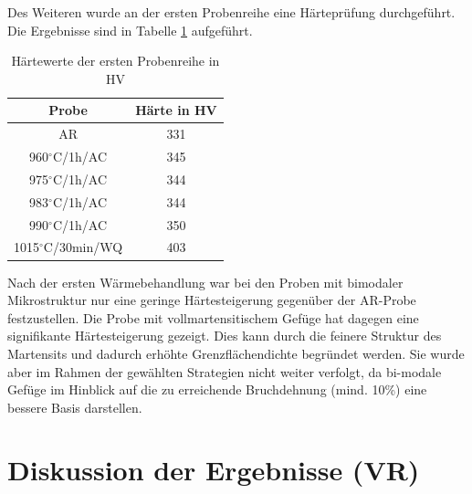 \pagebreak

Des Weiteren wurde an der ersten Probenreihe eine Härteprüfung durchgeführt. Die Ergebnisse sind in Tabelle \ref{Tabelle 5} aufgeführt. 

\begin{table}
	\centering
	\begin{tabular}{|c|c|}
		\hline 
		Probe & Härte in HV \\ 
		\hline 
		AR & 331 \\ 
		\hline 
		960$^\circ$C/1h/AC & 345 \\ 
		\hline 
		975$^\circ$C/1h/AC & 344 \\ 
		\hline 
		983$^\circ$C/1h/AC & 344 \\ 
		\hline 
		990$^\circ$C/1h/AC & 350 \\ 
		\hline 
		1015$^\circ$C/30min/WQ & 403 \\ 
		\hline 
	\end{tabular} 
	\caption{Härtewerte der ersten Probenreihe in HV}
	\label{Tabelle 5}
\end{table}

Nach der ersten Wärmebehandlung war bei den Proben mit bimodaler Mikrostruktur nur eine geringe Härtesteigerung gegenüber der AR-Probe festzustellen. 
Die Probe mit vollmartensitischem Gefüge hat dagegen eine signifikante Härtesteigerung gezeigt. Dies kann durch die feinere Struktur des Martensits und dadurch erhöhte Grenzflächendichte begründet werden. Sie wurde aber im Rahmen der gewählten Strategien nicht weiter verfolgt, da bi-modale Gefüge im Hinblick auf die zu erreichende Bruchdehnung (mind. 10\%) eine bessere Basis darstellen.


\section{Diskussion der Ergebnisse (VR)}

